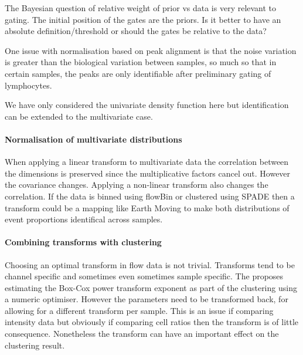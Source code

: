The Bayesian question of relative weight of prior vs data is very relevant to gating.
The initial position of the gates are the priors.
Is it better to have an absolute definition/threshold or should the gates be relative to the data?
 
One issue with normalisation based on peak alignment is that the noise variation is greater than the biological variation between samples, so much so that in certain samples, the peaks are only identifiable after preliminary gating of lymphocytes.

We have only considered the univariate density function here but identification can be extended to the multivariate case.

\paragraph{Normalisation of multivariate distributions}

When applying a linear transform to multivariate data the correlation between the dimensions is preserved since the multiplicative factors cancel out.
However the covariance changes.
Applying a non-linear transform also changes the correlation.
If the data is binned using flowBin or clustered using SPADE then a transform could be a mapping like Earth Moving to make both distributions of event proportions identifical across samples.

\paragraph{Combining transforms with clustering}

Choosing an optimal transform in flow data is not trivial.
Transforms tend to be channel specific and sometimes even sometimes sample specific.
The  proposes estimating the Box-Cox power transform exponent as part of the clustering using a numeric optimiser.
However the parameters need to be transformed back, for allowing for a different transform per sample.
This is an issue if comparing intensity data but obviously if comparing cell ratios then the transform is of little consequence.
Nonetheless the transform can have an important effect on the clustering result.

